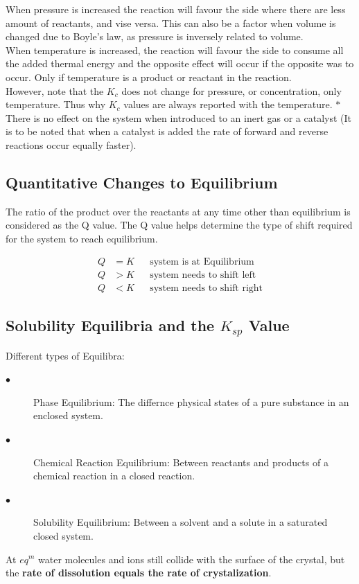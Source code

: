 \documentclass{article}
\begin{document}
\begin{paragraph}
When pressure is increased the reaction will favour the side where there are less amount of reactants, and vise versa. This can also be a factor when volume is changed due to Boyle's law, as pressure is inversely related to volume.\\

When temperature is increased, the reaction will favour the side to consume all the added thermal energy and the opposite effect will occur if the opposite was to occur. Only if temperature is a product or reactant in the reaction.\\

 However, note that the $K_c$ does not change for pressure, or concentration, only temperature. Thus why $K_c$ values are always reported with the temperature. $*$ There is no effect on the system when introduced to an inert gas or a catalyst (It is to be noted that when a catalyst is added the rate of forward and reverse reactions occur equally faster).\\


\subsection{Quantitative Changes to Equilibrium}

The ratio of the product over the reactants at any time other than equilibrium is considered as the Q value. The Q value helps determine the type of shift required for the system to reach equilibrium.

\begin{align*}
  Q &= K & & \text{system is at Equilibrium}    \\
  Q &> K &&  \text{system needs to shift left}  \\
  Q &< K &&  \text{system needs to shift right}
\end{align*}

\subsection{Solubility Equilibria and the $K_{sp}$ Value}

 Different types of Equilibra:

\begin{description}
\item[$\bullet$] Phase Equilibrium: The differnce physical states of a pure substance in an enclosed system.
\item[$\bullet$] Chemical Reaction Equilibrium: Between reactants and products of a chemical reaction in a closed reaction.
\item[$\bullet$] Solubility Equilibrium: Between a solvent and a solute in a saturated closed system.
\end{description}
At $eq^m$ water molecules and ions still collide with the surface of the crystal, but the \textbf{rate of dissolution equals the rate of crystalization}.


\end{paragraph}
\end{document}
